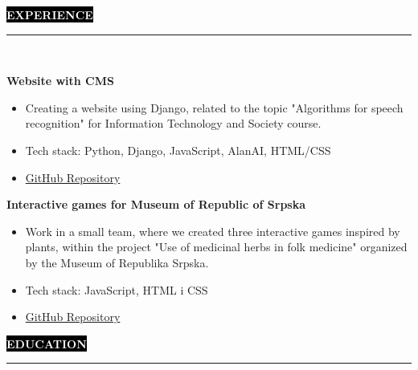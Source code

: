 \documentclass[9pt]{developercv} %
\begin{document}
\colorbox{black}{{\textcolor{white}{\textbf{\MakeUppercase{EXPERIENCE}}}}}
\par\noindent\rule{\textwidth}{2px}\\

\begin{minipage}[t]{0.45\textwidth}
	\vspace{-\baselineskip}
	
	{\textbf{Website with CMS}}
	\begin{itemize}
        \item Creating a website using Django, related to the topic "Algorithms for speech recognition" for Information Technology and Society course.
        \item Tech stack: Python, Django, JavaScript, AlanAI, HTML/CSS
        
        \item [\faExternalLink]{\href{https://github.com/vladocodes/PMF_ITAS_CMS}{GitHub Repository}}
    \end{itemize}
\end{minipage}
\hfill
\begin{minipage}[t]{0.45\textwidth}
    \vspace{-\baselineskip}
    
    {\textbf{Interactive games for Museum of Republic of Srpska }}
    \begin{itemize}
        \item Work in a small team, where we created three interactive games inspired by plants, within the project "Use of medicinal herbs in folk medicine" organized by the Museum of Republika Srpska. 
        \item  Tech stack: JavaScript, HTML i CSS \smallskip \smallskip
        \item [\faExternalLink]{\href{https://github.com/vladocodes/muzej-rs}{GitHub Repository}}
    \end{itemize}
\end{minipage}

\vspace{1cm}




\colorbox{black}{{\textcolor{white}{\textbf{\MakeUppercase{Education}}}}}
\par\noindent\rule{\textwidth}{2px}\\
        
\end{document}
